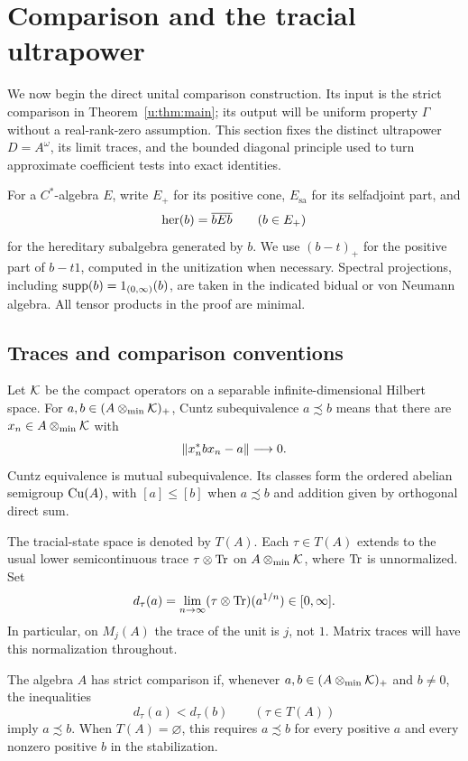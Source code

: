 \section{Comparison and the tracial ultrapower}
\label{u:sec:preliminaries}

We now begin the direct unital comparison construction. Its input is the strict comparison in Theorem~\ref{u:thm:main}; its output will be uniform property $\Gamma$ without a real-rank-zero assumption. This section fixes the distinct ultrapower $D=A^\omega$, its limit traces, and the bounded diagonal principle used to turn approximate coefficient tests into exact identities.

For a $C^*$-algebra $E$, write $E_+$ for its positive cone, $E_{\mathrm{sa}}$
for its selfadjoint part, and
\[
 \operatorname{her}(b)=\overline{bEb}\qquad(b\in E_+)
\]
for the hereditary subalgebra generated by $b$. We use
$(b-t)_+$ for the positive part of $b-t1$, computed in the unitization
when necessary. Spectral projections, including
$\operatorname{supp}(b)=1_{(0,\infty)}(b)$, are taken in the indicated bidual or von
Neumann algebra. All tensor products in the proof are minimal.

\subsection{Traces and comparison conventions}

Let $\mathcal K$ be the compact operators on a separable infinite-dimensional
Hilbert space. For $a,b\in(A\otimes_{\min}\mathcal K)_+$, Cuntz subequivalence
$a\precsim b$ means that there are $x_n\in A\otimes_{\min}\mathcal K$ with
\[
 \lVert x_n^*bx_n-a\rVert\longrightarrow0.
\]
Cuntz equivalence is mutual subequivalence. Its classes form the
ordered abelian semigroup $\operatorname{Cu}(A)$, with $[a]\le[b]$ when $a\precsim b$
and addition given by orthogonal direct sum.

The tracial-state space is denoted by $T(A)$. Each $\tau\in T(A)$
extends to the usual lower semicontinuous trace $\tau\otimes\operatorname{Tr}$ on
$A\otimes_{\min}\mathcal K$, where $\operatorname{Tr}$ is unnormalized. Set
\[
 d_\tau(a)=\lim_{n\to\infty}(\tau\otimes\operatorname{Tr})(a^{1/n})
       \in[0,\infty].
\]
In particular, on $M_j(A)$ the trace of the unit is $j$, not $1$.
Matrix traces will have this normalization throughout.

\begin{definition}
\label{u:def:strict-comparison}
The algebra $A$ has strict comparison if, whenever
$a,b\in(A\otimes_{\min}\mathcal K)_+$ and $b\ne0$, the inequalities
\[
 d_\tau(a)<d_\tau(b)\qquad(\tau\in T(A))
\]
imply $a\precsim b$. When $T(A)=\varnothing$, this requires
$a\precsim b$ for every positive $a$ and every nonzero positive $b$
in the stabilization.
\end{definition}

